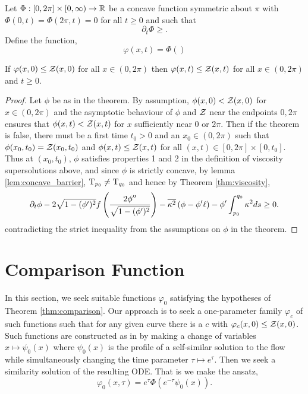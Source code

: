 \documentclass[a4paper, 12pt]{amsart}
\begin{document}
\begin{thm}
\label{thm:comparison}
Let \(\Phi : [0, 2\pi] \times [0, \infty) \to \mathbb{R}\) be a concave function symmetric about \(\pi\) with \(\Phi(0, t) = \Phi(2\pi, t) = 0\) for all \(t \geq 0\) and such that
\[
\partial_t \Phi \geq .
\]
Define the function,
\[
\varphi(x, t) = \Phi()
\]

If \(\varphi (x, 0) \leq \operatorname{\mathcal{Z}}(x, 0)\) for all \(x \in (0, 2\pi)\) then \(\varphi (x, t) \leq \operatorname{\mathcal{Z}}(x, t)\) for all \(x \in (0, 2\pi)\) and \(t \geq 0\).
\end{thm}

\begin{proof}
Let $\phi$ be as in the theorem. By assumption, $\phi(x, 0) < \operatorname{\mathcal{Z}}(x, 0)$ for $x\in (0,2\pi)$ and the asymptotic behaviour of $\phi$ and $\operatorname{\mathcal{Z}}$ near the endpoints $0,2\pi$ ensures that $\phi(x, t) < \operatorname{\mathcal{Z}}(x, t)$ for $x$ sufficiently near $0$ or $2\pi$. Then if the theorem is false, there must be a first time $t_0>0$ and an $x_0\in(0,2\pi)$ such that $\phi(x_0, t_0) = \operatorname{\mathcal{Z}}(x_0, t_0)$ and $\phi(x, t) \leq \operatorname{\mathcal{Z}}(x, t)$ for all $(x,t) \in [0,2\pi] \times [0, t_0]$. Thus at $(x_0,t_0)$, $\phi$ satisfies properties 1 and 2 in the definition of viscosity supersolutions above, and since $\phi$ is strictly concave, by lemma \ref{lem:concave_barrier}, $\operatorname{T}_{p_0} \ne \operatorname{T}_{q_0}$ and hence by Theorem \ref{thm:viscosity},
\[
\partial_t\phi - 2\sqrt{1 - (\phi')^2}f\left(\frac{2\phi''}{\sqrt{1-(\phi')^2}}\right) - \overline{{\kappa^2}} \left(\phi - \phi'\ell\right) - \phi' \int_{p_0}^{q_0} \kappa^2 ds \geq 0.
\]
contradicting the strict inequality from the assumptions on $\phi$ in the theorem.
\end{proof}

\section{Comparison Function}
\label{sec:comparison_function}

In this section, we seek suitable functions $\varphi_0$ satisfying the hypotheses of Theorem \ref{thm:comparison}. Our approach is to seek a one-parameter family $\varphi_c$ of such functions such that for any given curve there is a $c$ with $\varphi_c(x, 0) \leq \operatorname{\mathcal{Z}}(x, 0)$. Such functions are constructed as in \cite{MR2794630} by making a change of variables $x \mapsto \psi_0(x)$ where $\psi_0(x)$ is the profile of a self-similar solution to the flow while simultaneously changing the time parameter $\tau \mapsto e^{\tau}$. Then we seek a similarity solution of the resulting ODE. That is we make the ansatz,
\[
\varphi_0(x, \tau) = e^{\tau} \Phi(e^{-\tau} \psi_0(x)).
\]
\end{document}

